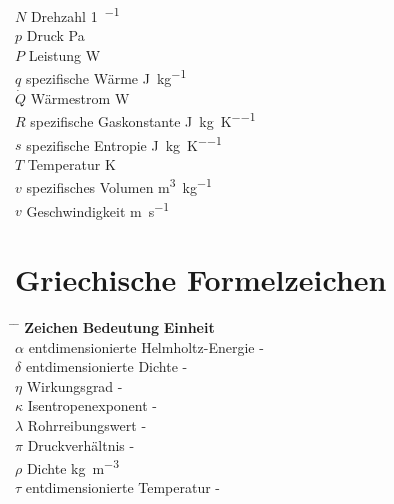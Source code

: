\begin{tabbing}
    $N$         \>  Drehzahl                            \>  \si{1\per\min} \\
    $p$         \>  Druck                               \>  \si{\Pa}  \\
    $P$         \>  Leistung                            \>  \si{\W}   \\
    $q$         \>  spezifische Wärme                   \>  \si{\J\per\kg} \\
    $\dot{Q}$   \>  Wärmestrom                          \>  \si{\W}   \\
    $R$         \>  spezifische Gaskonstante            \>  \si{\J\per\kg\per\K} \\
    $s$         \>  spezifische Entropie                \>  \si{\J\per\kg\per\K} \\
    $T$         \>  Temperatur                          \>  \si{\K}   \\ 
    $v$         \>  spezifisches Volumen                \>  \si{\m\cubed\per\kg} \\
    $v$         \>  Geschwindigkeit                     \>  \si{\m\per\s} \\
\end{tabbing}

\section*{Griechische Formelzeichen}

\begin{tabbing}
	\hspace*{3cm} \= \hspace*{8cm} \= \hspace*{2cm}\kill
	\textbf{Zeichen} \> \textbf{Bedeutung} 				\>	\textbf{Einheit}		\\[5mm]
	$\alpha$    \>  entdimensionierte Helmholtz-Energie \>  -  \\
    $\delta$    \>  entdimensionierte Dichte            \>  -  \\
    $\eta$		\>	Wirkungsgrad						\>	-  \\
	$\kappa$	\>	Isentropenexponent					\>	-  \\
    $\lambda$   \>  Rohrreibungswert                    \>  -  \\
	$\pi$		\>	Druckverhältnis						\>	-  \\
	$\rho$	    \>	Dichte								\>     \si{\kg\per\cubic\m}	\\
    $\tau$      \>  entdimensionierte Temperatur        \>  -  \\
\end{tabbing}

